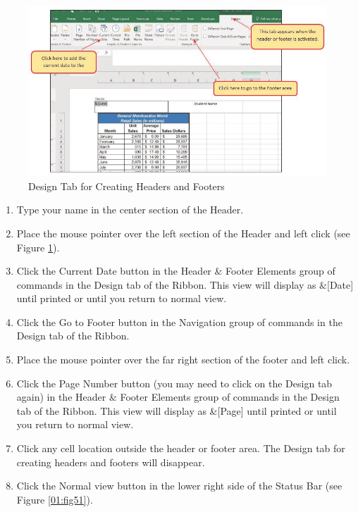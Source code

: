 \begin{figure}[H]
	\centering
	\includegraphics[width=\maxwidth{.95\linewidth}]{gfx/ch01_fig50}
	\caption{Design Tab for Creating Headers and Footers}
	\label{01:fig50}
\end{figure}

\begin{enumerate}[resume]
	\item Type your name in the center section of the Header.
	\item Place the mouse pointer over the left section of the Header and left click (see Figure \ref{01:fig50}).
	\item Click the Current Date button in the Header \& Footer Elements group of commands in the Design tab of the Ribbon. This view will display as \&[Date] until printed or until you return to normal view.
	\item Click the Go to Footer button in the Navigation group of commands in the Design tab of the Ribbon.
	\item Place the mouse pointer over the far right section of the footer and left click.
	\item Click the Page Number button (you may need to click on the Design tab again) in the Header \& Footer Elements group of commands in the Design tab of the Ribbon. This view will display as \&[Page] until printed or until you return to normal view.
	\item Click any cell location outside the header or footer area. The Design tab for creating headers and footers will disappear.
	\item Click the Normal view button in the lower right side of the Status Bar (see Figure \ref{01:fig51}).

\end{enumerate}

